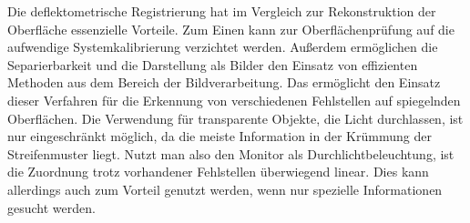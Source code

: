 \p
Die deflektometrische Registrierung hat im Vergleich zur Rekonstruktion der Oberfläche essenzielle Vorteile.
Zum Einen kann zur Oberflächenprüfung auf die aufwendige Systemkalibrierung verzichtet werden.
Außerdem ermöglichen die Separierbarkeit und die Darstellung als Bilder den Einsatz von effizienten Methoden aus dem Bereich der Bildverarbeitung.
Das ermöglicht den Einsatz dieser Verfahren für die Erkennung von verschiedenen Fehlstellen auf spiegelnden Oberflächen.
Die Verwendung für transparente Objekte, die Licht durchlassen, ist nur eingeschränkt möglich, da die meiste Information in der Krümmung der Streifenmuster liegt.
Nutzt man also den Monitor als Durchlichtbeleuchtung, ist die Zuordnung trotz vorhandener Fehlstellen überwiegend linear.
Dies kann allerdings auch zum Vorteil genutzt werden, wenn nur spezielle Informationen gesucht werden.